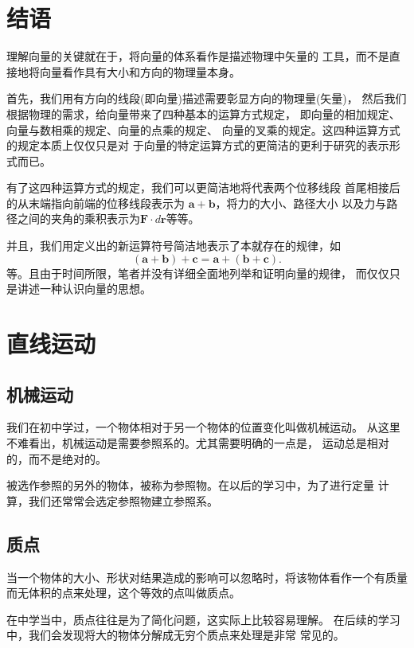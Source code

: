 \section*{结语}
理解向量的关键就在于，将向量的体系看作是描述物理中矢量的
工具，而不是直接地将向量看作具有大小和方向的物理量本身。

首先，我们用有方向的线段(即向量)描述需要彰显方向的物理量(矢量)，
然后我们根据物理的需求，给向量带来了四种基本的运算方式规定，
即向量的相加规定、向量与数相乘的规定、向量的点乘的规定、
向量的叉乘的规定。这四种运算方式的规定本质上仅仅只是对
于向量的特定运算方式的更简洁的更利于研究的表示形式而已。

有了这四种运算方式的规定，我们可以更简洁地将代表两个位移线段
首尾相接后的从末端指向前端的位移线段表示为
$\boldsymbol{a}+\boldsymbol{b}$，将力的大小、路径大小
以及力与路径之间的夹角的乘积表示为$\boldsymbol{F}
\cdot d\boldsymbol{r}$等等。

并且，我们用定义出的新运算符号简洁地表示了本就存在的规律，如
\begin{equation}
    (\boldsymbol{a}+\boldsymbol{b})+\boldsymbol{c}=
    \boldsymbol{a}+(\boldsymbol{b}+\boldsymbol{c}).
\end{equation}
等。且由于时间所限，笔者并没有详细全面地列举和证明向量的规律，
而仅仅只是讲述一种认识向量的思想。
\section{直线运动}
\subsection{机械运动}
我们在初中学过，一个物体相对于另一个物体的位置变化叫做机械运动。
从这里不难看出，机械运动是需要参照系的。尤其需要明确的一点是，
运动总是相对的，而不是绝对的。

\begin{definition}
    被选作参照的另外的物体，被称为参照物。在以后的学习中，为了进行定量
    计算，我们还常常会选定参照物建立参照系。
\end{definition}
\subsection{质点}
\begin{definition}
    当一个物体的大小、形状对结果造成的影响可以忽略时，将该物体看作一个有质量
    而无体积的点来处理，这个等效的点叫做质点。
\end{definition}

在中学当中，质点往往是为了简化问题，这实际上比较容易理解。
在后续的学习中，我们会发现将大的物体分解成无穷个质点来处理是非常
常见的。
